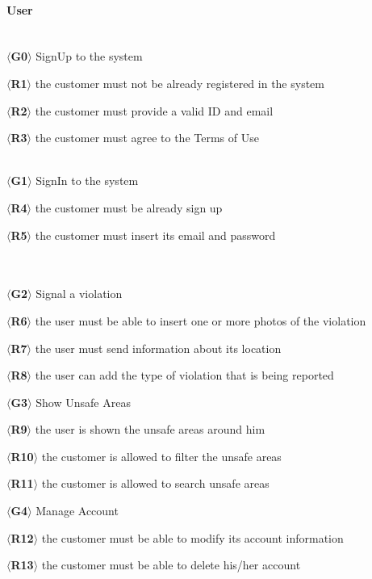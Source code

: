 \documentclass{article}
\begin{document}
\paragraph{User}\mbox{}\\
$\langle$\textbf{G0}$\rangle$ SignUp to the system
\begin{description}
    \item $\langle$\textbf{R1}$\rangle$ the customer must not be already
    registered  in the system
    \item $\langle$\textbf{R2}$\rangle$ the customer must provide a valid ID and
    email
    \item $\langle$\textbf{R3}$\rangle$ the customer must agree to the Terms of Use
\end{description}\mbox{}\\
$\langle$\textbf{G1}$\rangle$ SignIn to the system
\begin{description}
    \item $\langle$\textbf{R4}$\rangle$ the customer must be already sign up
    \item $\langle$\textbf{R5}$\rangle$ the customer must insert its email and
    password \end{description}\mbox{}\\\\
$\langle$\textbf{G2}$\rangle$ Signal a violation
\begin{description}
    \item $\langle$\textbf{R6}$\rangle$ the user must be able to insert one or
    more photos of the violation
    \item $\langle$\textbf{R7}$\rangle$ the user must send information about its
    location
    \item $\langle$\textbf{R8}$\rangle$ the user can add the type of violation
    that is being reported
\end{description}
$\langle$\textbf{G3}$\rangle$ Show Unsafe Areas
\begin{description}
    \item $\langle$\textbf{R9}$\rangle$ the user is shown the unsafe areas around
    him
    \item $\langle$\textbf{R10}$\rangle$ the customer is allowed to filter the unsafe
    areas
    \item $\langle$\textbf{R11}$\rangle$ the customer is allowed to search unsafe
    areas 
\end{description}    
$\langle$\textbf{G4}$\rangle$ Manage Account
\begin{description}
    \item $\langle$\textbf{R12}$\rangle$ the customer must be able to modify its
    account information
    \item $\langle$\textbf{R13}$\rangle$ the customer must be able to delete his/her
    account
\end{description}
\end{document}
